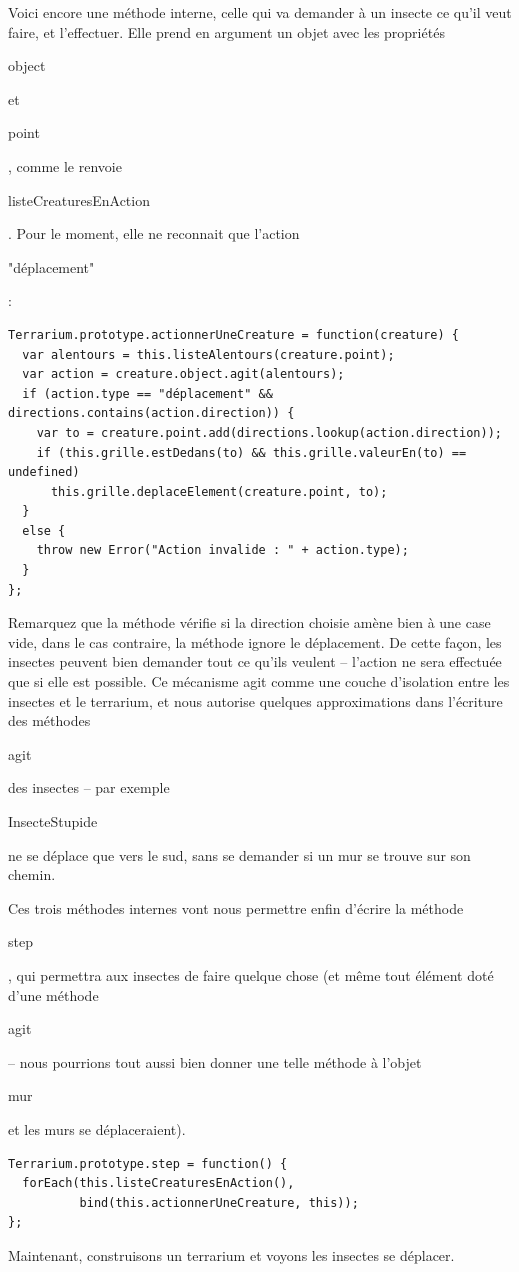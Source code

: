 \documentclass{FramateX}
\renewcommand{\texttt}[1]{\begin{sffamily}{#1}\end{sffamily}}
\begin{document}
\begin{center}\end{center}

Voici encore une méthode interne, celle qui va demander à un insecte ce
qu'il veut faire, et l'effectuer. Elle prend en argument un objet avec
les propriétés \texttt{object} et \texttt{point}, comme le renvoie
\texttt{listeCreaturesEnAction}. Pour le moment, elle ne reconnait que
l'action \texttt{"déplacement"} :

\begin{lstlisting}
Terrarium.prototype.actionnerUneCreature = function(creature) {
  var alentours = this.listeAlentours(creature.point);
  var action = creature.object.agit(alentours);
  if (action.type == "déplacement" && directions.contains(action.direction)) {
    var to = creature.point.add(directions.lookup(action.direction));
    if (this.grille.estDedans(to) && this.grille.valeurEn(to) == undefined)
      this.grille.deplaceElement(creature.point, to);
  }
  else {
    throw new Error("Action invalide : " + action.type);
  }
};
\end{lstlisting}
Remarquez que la méthode vérifie si la direction choisie amène bien à
une case vide, dans le cas contraire, la méthode ignore le déplacement.
De cette façon, les insectes peuvent bien demander tout ce qu'ils
veulent -- l'action ne sera effectuée que si elle est possible. Ce
mécanisme agit comme une couche d'isolation entre les insectes et le
terrarium, et nous autorise quelques approximations dans l'écriture des
méthodes \texttt{agit} des insectes -- par exemple
\texttt{InsecteStupide} ne se déplace que vers le sud, sans se demander
si un mur se trouve sur son chemin.

\begin{center}\end{center}

Ces trois méthodes internes vont nous permettre enfin d'écrire la
méthode \texttt{step}, qui permettra aux insectes de faire quelque chose
(et même tout élément doté d'une méthode \texttt{agit} -- nous pourrions
tout aussi bien donner une telle méthode à l'objet \texttt{mur} et les
murs se déplaceraient).

\begin{lstlisting}
Terrarium.prototype.step = function() {
  forEach(this.listeCreaturesEnAction(),
          bind(this.actionnerUneCreature, this));
};
\end{lstlisting}
Maintenant, construisons un terrarium et voyons les insectes se
déplacer.
\end{document}

